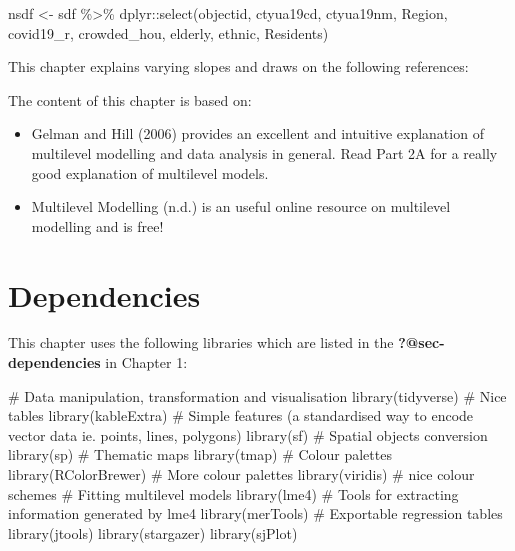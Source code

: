 \documentclass[
  letterpaper,
  krantz2]{style/krantz}
\newenvironment{Shaded}{\begin{snugshade}}{\end{snugshade}}
\newcommand{\CommentTok}[1]{\textcolor[rgb]{0.37,0.37,0.37}{#1}}
\newcommand{\FunctionTok}[1]{\textcolor[rgb]{0.28,0.35,0.67}{#1}}
\newcommand{\NormalTok}[1]{\textcolor[rgb]{0.00,0.23,0.31}{#1}}
\newcommand{\OtherTok}[1]{\textcolor[rgb]{0.00,0.23,0.31}{#1}}
\newcommand{\SpecialCharTok}[1]{\textcolor[rgb]{0.37,0.37,0.37}{#1}}
\begin{document}
\begin{Shaded}
\begin{Highlighting}[]
\NormalTok{nsdf }\OtherTok{\textless{}{-}}\NormalTok{ sdf  }\SpecialCharTok{\%\textgreater{}\%}\NormalTok{  dplyr}\SpecialCharTok{::}\FunctionTok{select}\NormalTok{(objectid, }
\NormalTok{                         ctyua19cd, }
\NormalTok{                         ctyua19nm, }
\NormalTok{                         Region, }
\NormalTok{                         covid19\_r, }
\NormalTok{                         crowded\_hou, }
\NormalTok{                         elderly, }
\NormalTok{                         ethnic, }
\NormalTok{                         Residents)}
\end{Highlighting}
\end{Shaded}

This chapter explains varying slopes and draws on the following
references:

The content of this chapter is based on:

\begin{itemize}
\item
  Gelman and Hill (2006) provides an excellent and intuitive explanation
  of multilevel modelling and data analysis in general. Read Part 2A for
  a really good explanation of multilevel models.
\item
  Multilevel Modelling (n.d.) is an useful online resource on multilevel
  modelling and is free!
\end{itemize}

\hypertarget{dependencies-6}{%
\section{Dependencies}\label{dependencies-6}}

This chapter uses the following libraries which are listed in the
\textbf{?@sec-dependencies} in Chapter 1:

\begin{Shaded}
\begin{Highlighting}[]
\CommentTok{\# Data manipulation, transformation and visualisation}
\FunctionTok{library}\NormalTok{(tidyverse)}
\CommentTok{\# Nice tables}
\FunctionTok{library}\NormalTok{(kableExtra)}
\CommentTok{\# Simple features (a standardised way to encode vector data ie. points, lines, polygons)}
\FunctionTok{library}\NormalTok{(sf) }
\CommentTok{\# Spatial objects conversion}
\FunctionTok{library}\NormalTok{(sp) }
\CommentTok{\# Thematic maps}
\FunctionTok{library}\NormalTok{(tmap) }
\CommentTok{\# Colour palettes}
\FunctionTok{library}\NormalTok{(RColorBrewer) }
\CommentTok{\# More colour palettes}
\FunctionTok{library}\NormalTok{(viridis) }\CommentTok{\# nice colour schemes}
\CommentTok{\# Fitting multilevel models}
\FunctionTok{library}\NormalTok{(lme4)}
\CommentTok{\# Tools for extracting information generated by lme4}
\FunctionTok{library}\NormalTok{(merTools)}
\CommentTok{\# Exportable regression tables}
\FunctionTok{library}\NormalTok{(jtools)}
\FunctionTok{library}\NormalTok{(stargazer)}
\FunctionTok{library}\NormalTok{(sjPlot)}
\end{Highlighting}
\end{Shaded}
\end{document}
